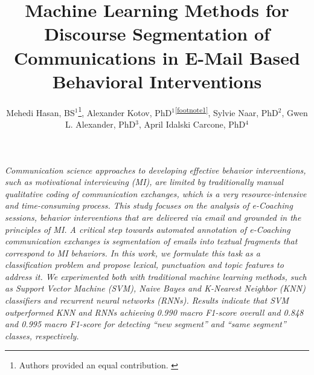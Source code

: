 \documentclass{amia}
\begin{document}
\title{Machine Learning Methods for Discourse Segmentation of Communications in E-Mail Based Behavioral Interventions}

\author{Mehedi Hasan, BS$^{1}$\footnote[1]{Authors provided an equal contribution. \label{footnote1}}, Alexander Kotov, PhD$^{1}$\textsuperscript{\ref{footnote1}}, Sylvie Naar, PhD$^{2}$, Gwen L. Alexander, PhD$^{3}$, April Idalski Carcone, PhD$^{4}$}


\maketitle

\textit{Communication science approaches to developing effective behavior interventions, such as motivational interviewing (MI), are limited by traditionally manual qualitative coding of communication exchanges, which is a very resource-intensive and time-consuming process. This study focuses on the analysis of e-Coaching sessions, behavior interventions that are delivered via email and grounded in the principles of MI. A critical step towards automated annotation of e-Coaching communication exchanges is segmentation of emails into textual fragments that correspond to MI behaviors. In this work, we formulate this task as a classification problem and propose lexical, punctuation and topic features to address it. We experimented both with traditional machine learning methods, such as Support Vector Machine (SVM), Naive Bayes and K-Nearest Neighbor (KNN) classifiers and recurrent neural networks (RNNs). Results indicate that SVM outperformed KNN and RNNs achieving 0.990 macro F1-score overall and 0.848 and 0.995 macro F1-score for detecting ``new segment'' and ``same segment'' classes, respectively.}
\end{document}
